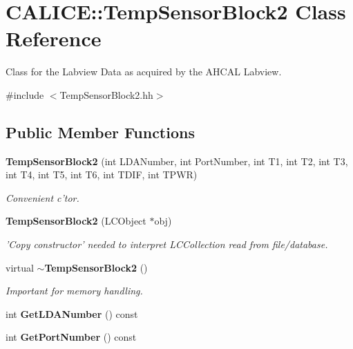 \section{CALICE::TempSensorBlock2 Class Reference}
\label{classCALICE_1_1TempSensorBlock2}


Class for the Labview Data as acquired by the AHCAL Labview.  


{\ttfamily \#include $<$TempSensorBlock2.hh$>$}\subsection*{Public Member Functions}
\begin{DoxyCompactItemize}
\item 
{\bf TempSensorBlock2} (int LDANumber, int PortNumber, int T1, int T2, int T3, int T4, int T5, int T6, int TDIF, int TPWR)\label{classCALICE_1_1TempSensorBlock2_a54e191771f53ca8f7cbb1515d7aca02f}

\begin{DoxyCompactList}\small\item\em Convenient c'tor. \item\end{DoxyCompactList}\item 
{\bf TempSensorBlock2} (LCObject $\ast$obj)\label{classCALICE_1_1TempSensorBlock2_a38018a53d6021897d93a8c5dceb4d414}

\begin{DoxyCompactList}\small\item\em 'Copy constructor' needed to interpret LCCollection read from file/database. \item\end{DoxyCompactList}\item 
virtual {\bf $\sim$TempSensorBlock2} ()\label{classCALICE_1_1TempSensorBlock2_af5f34f2ff55c040772d6608011f215be}

\begin{DoxyCompactList}\small\item\em Important for memory handling. \item\end{DoxyCompactList}\item 
int {\bfseries GetLDANumber} () const \label{classCALICE_1_1TempSensorBlock2_a13a5db490dd71b4986d7f9a9f8305ed5}

\item 
int {\bfseries GetPortNumber} () const \label{classCALICE_1_1TempSensorBlock2_ac954ae46175ebe0fc480e4961645149a}


\end{DoxyCompactItemize}
